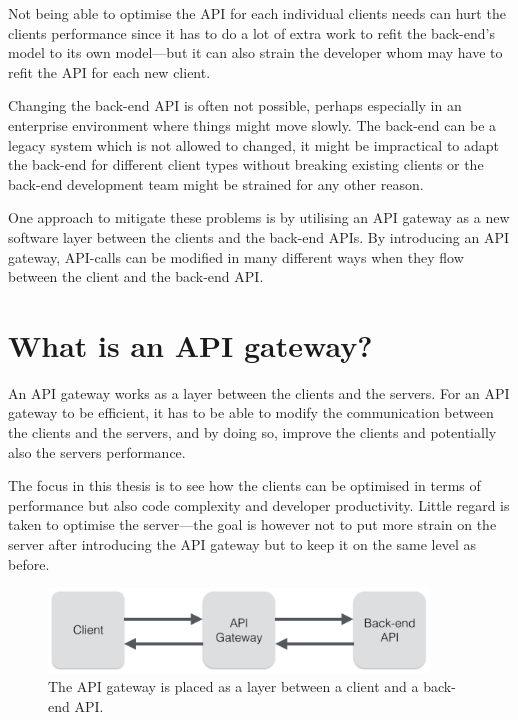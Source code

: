 \documentclass{cslthse-msc}
\begin{document}
Not being able to optimise the API for each individual clients needs can hurt the clients performance since it has to do a lot of extra work to refit the back-end's model to its own model---but it can also strain the developer whom may have to refit the API for each new client.

Changing the back-end API is often not possible, perhaps especially in an enterprise environment where things might move slowly. The back-end can be a legacy system which is not allowed to changed, it might be impractical to adapt the back-end for different client types without breaking existing clients or the back-end development team might be strained for any other reason. 

One approach to mitigate these problems is by utilising an API gateway as a new software layer between the clients and the back-end APIs. By introducing an API gateway, API-calls can be modified in many different ways when they flow between the client and the back-end API.

\section{What is an API gateway?}
An API gateway works as a layer between the clients and the servers. For an API gateway to be efficient, it has to be able to modify the communication between the clients and the servers, and by doing so, improve the clients and potentially also the servers performance.

The focus in this thesis is to see how the clients can be optimised in terms of performance but also code complexity and developer productivity. Little regard is taken to optimise the server---the goal is however not to put more strain on the server after introducing the API gateway but to keep it on the same level as before.

\begin{figure}[H]
  \centering
    \begin{center}
      \includegraphics[width=0.9\textwidth]{images/api_gateway.png}
    \end{center}
  \caption{The API gateway is placed as a layer between a client and a back-end API.}
\end{figure}
\end{document}
